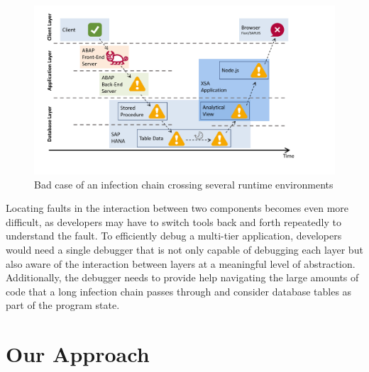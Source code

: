 \begin{figure}[t]
\centering
\includegraphics[width=.9\linewidth]{img/worstcase}
\caption{Bad case of an infection chain crossing several runtime environments}
\label{fig:worstcase}
\end{figure}

Locating faults in the interaction between two components becomes even more difficult, as developers may have to switch tools back and forth repeatedly to understand the fault.
To efficiently debug a multi-tier application, developers would need a single debugger that is not only capable of debugging each layer but also aware of the interaction between layers at a meaningful level of abstraction.
Additionally, the debugger needs to provide help
navigating the large amounts of code that a long infection chain passes through
and consider database tables as part of the program state.



\section{Our Approach} %

